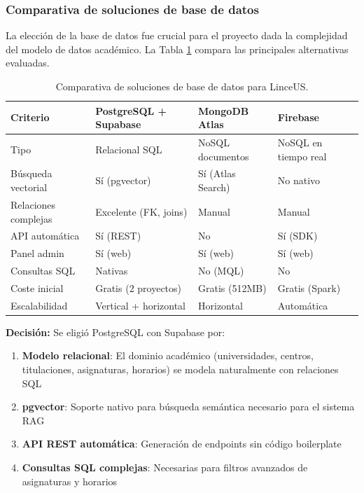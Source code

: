 \subsubsection{Comparativa de soluciones de base de datos}

La elección de la base de datos fue crucial para el proyecto dada la complejidad del modelo de datos académico. La Tabla \ref{tab:comp-bd} compara las principales alternativas evaluadas.

\begin{table}[h]
\centering
\begin{tabular}{|l|p{2.8cm}|p{2.8cm}|p{2.8cm}|}
\hline
\textbf{Criterio} & \textbf{PostgreSQL + Supabase} & \textbf{MongoDB Atlas} & \textbf{Firebase} \\ \hline
Tipo & Relacional SQL & NoSQL documentos & NoSQL en tiempo real \\ \hline
Búsqueda vectorial & Sí (pgvector) & Sí (Atlas Search) & No nativo \\ \hline
Relaciones complejas & Excelente (FK, joins) & Manual & Manual \\ \hline
API automática & Sí (REST) & No & Sí (SDK) \\ \hline
Panel admin & Sí (web) & Sí (web) & Sí (web) \\ \hline
Consultas SQL & Nativas & No (MQL) & No \\ \hline
Coste inicial & Gratis (2 proyectos) & Gratis (512MB) & Gratis (Spark) \\ \hline
Escalabilidad & Vertical + horizontal & Horizontal & Automática \\ \hline
\end{tabular}
\caption{Comparativa de soluciones de base de datos para LinceUS.}
\label{tab:comp-bd}
\end{table}

\textbf{Decisión:} Se eligió PostgreSQL con Supabase por:
\begin{enumerate}
    \item \textbf{Modelo relacional}: El dominio académico (universidades, centros, titulaciones, asignaturas, horarios) se modela naturalmente con relaciones SQL
    \item \textbf{pgvector}: Soporte nativo para búsqueda semántica necesario para el sistema RAG
    \item \textbf{API REST automática}: Generación de endpoints sin código boilerplate
    \item \textbf{Consultas SQL complejas}: Necesarias para filtros avanzados de asignaturas y horarios
\end{enumerate}

